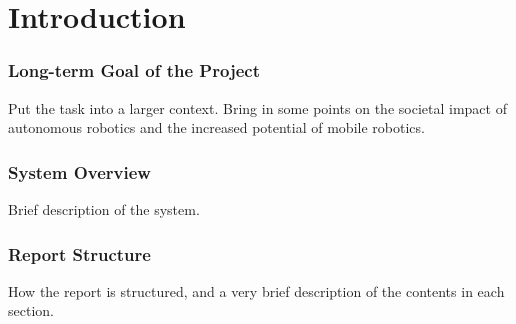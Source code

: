 \chapter{Introduction}

\subsection{Long-term Goal of the Project}

Put the task into a larger context. Bring in some points on the societal impact of autonomous robotics and the increased potential of mobile robotics.  

\subsection{System Overview}

Brief description of the system.

\subsection{Report Structure}
How the report is structured, and a very brief description of the contents in each section.